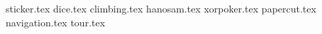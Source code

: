 \documentclass[11pt,a4paper,oneside,korean]{article}
\begin{document}
    \kcpcintroctd
    
    \newpage
    
    {sticker.tex}    
    {dice.tex}
    {climbing.tex}
    {hanosam.tex}
    {xorpoker.tex}
    {papercut.tex}
    {navigation.tex}
    {tour.tex}
    
\end{document}
